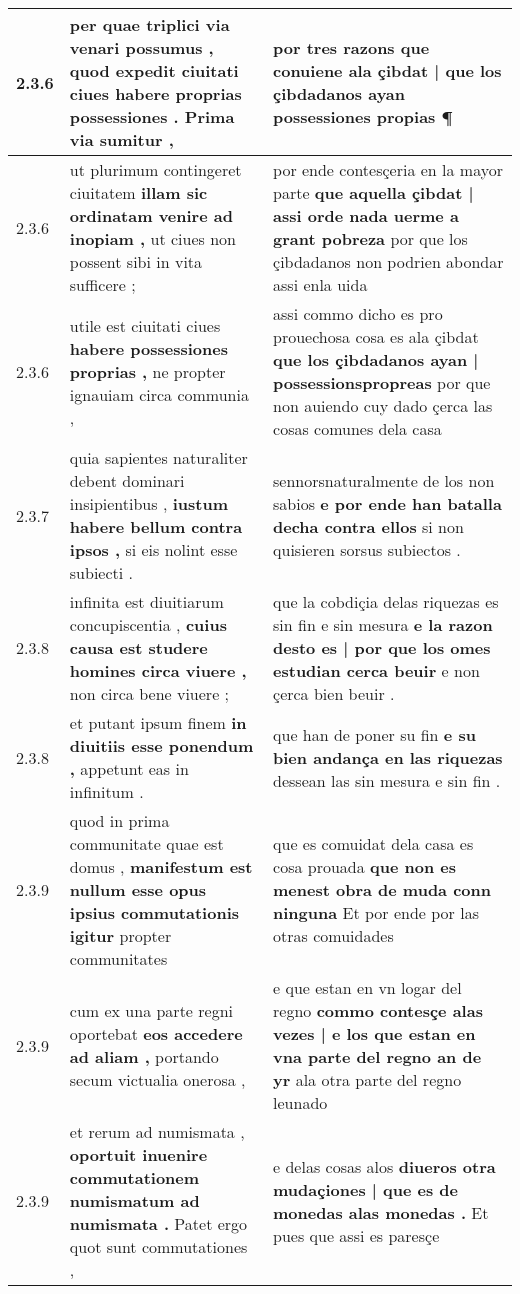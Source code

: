 \begin{tabular}{|p{1cm}|p{6.5cm}|p{6.5cm}|}
2.3.6 & per quae triplici via venari possumus , \textbf{ quod expedit ciuitati ciues habere proprias possessiones . } Prima via sumitur , & por tres razons \textbf{ que conuiene ala çibdat | que los çibdadanos ayan possessiones propias } ¶ \\\hline
2.3.6 & ut plurimum contingeret ciuitatem \textbf{ illam sic ordinatam venire ad inopiam , } ut ciues non possent sibi in vita sufficere ; & por ende contesçeria en la mayor parte \textbf{ que aquella çibdat | assi orde nada uerme a grant pobreza } por que los çibdadanos non podrien abondar assi enla uida \\\hline
2.3.6 & utile est ciuitati ciues \textbf{ habere possessiones proprias , } ne propter ignauiam circa communia , & assi commo dicho es pro prouechosa cosa es ala çibdat \textbf{ que los çibdadanos ayan | possessionspropreas } por que non auiendo cuy dado çerca las cosas comunes dela casa \\\hline
2.3.7 & quia sapientes naturaliter debent dominari insipientibus , \textbf{ iustum habere bellum contra ipsos , } si eis nolint esse subiecti . & sennorsnaturalmente de los non sabios \textbf{ e por ende han batalla decha contra ellos } si non quisieren sorsus subiectos . \\\hline
2.3.8 & infinita est diuitiarum concupiscentia , \textbf{ cuius causa est studere homines circa viuere , } non circa bene viuere ; & que la cobdiçia delas riquezas es sin fin e sin mesura \textbf{ e la razon desto es | por que los omes estudian cerca beuir } e non çerca bien beuir . \\\hline
2.3.8 & et putant ipsum finem \textbf{ in diuitiis esse ponendum , } appetunt eas in infinitum . & que han de poner su fin \textbf{ e su bien andança en las riquezas } dessean las sin mesura e sin fin . \\\hline
2.3.9 & quod in prima communitate quae est domus , \textbf{ manifestum est nullum esse opus ipsius commutationis igitur } propter communitates & que es comuidat dela casa es cosa prouada \textbf{ que non es menest obra de muda conn ninguna } Et por ende por las otras comuidades \\\hline
2.3.9 & cum ex una parte regni oportebat \textbf{ eos accedere ad aliam , } portando secum victualia onerosa , & e que estan en vn logar del regno \textbf{ commo contesçe alas vezes | e los que estan en vna parte del regno an de yr } ala otra parte del regno leunado \\\hline
2.3.9 & et rerum ad numismata , \textbf{ oportuit inuenire commutationem numismatum ad numismata . } Patet ergo quot sunt commutationes , & e delas cosas alos \textbf{ diueros otra mudaçiones | que es de monedas alas monedas . } Et pues que assi es paresçe \\\hline

\end{tabular}
